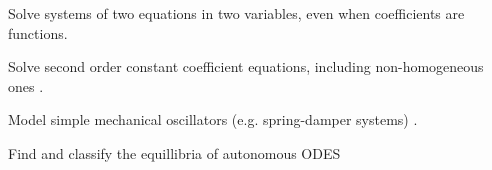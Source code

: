 \begin{readinessAssuranceOutcomes}
\item Solve systems of two equations in two variables, even when coefficients are functions.
\item Solve second order constant coefficient equations, including non-homogeneous ones .
\item Model simple mechanical oscillators (e.g. spring-damper systems)  .
\item Find and classify the equillibria of autonomous ODES 
\end{readinessAssuranceOutcomes}
